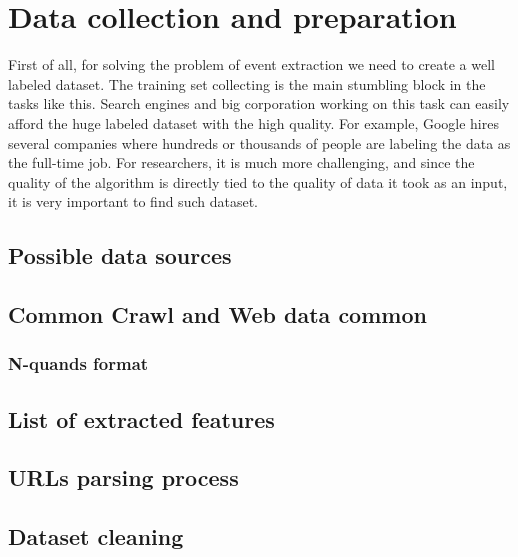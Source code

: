 \chapter{Data collection and preparation}
\label{chap:datacollect}

First of all, for solving the problem of event extraction we need to create a well labeled dataset. The training set collecting is the main stumbling block in the tasks like this. Search engines and big corporation working on this task can easily afford the huge labeled dataset with the high quality. For example, Google hires several companies where hundreds or thousands of people are labeling the data as the full-time job. For researchers, it is much more challenging, and since the quality of the algorithm is directly tied to the quality of data it took as an input, it is very important to find such dataset. 


\section{Possible data sources}
\section{Common Crawl and Web data common}
\subsection{N-quands format}
\section{List of extracted features}
\section{URLs parsing process}
\section{Dataset cleaning}